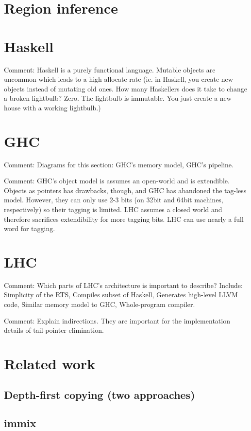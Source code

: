 \documentclass[a4paper,oneside]{memoir}
\newcommand{\makecomment}[1]{{\color{red} Comment: #1}}
\begin{document}
\section{Region inference}


\section{Haskell}
\makecomment{Haskell is a purely functional language.\cite{HaskellReport} Mutable objects are
uncommon which leads to a high allocate rate (ie. in Haskell, you create new
objects instead of mutating old ones. How many Haskellers does it take to
change a broken lightbulb? Zero. The lightbulb is immutable. You just create
a new house with a working lightbulb.)}

\section{GHC}
\makecomment{Diagrams for this section: GHC's memory model, GHC's pipeline.}

\makecomment{GHC's object model is assumes an open-world and is extendible.
Objects as pointers has drawbacks, though, and GHC has abandoned the tag-less
model. However, they can only use 2-3 bits (on 32bit and 64bit machines,
respectively) so their tagging is limited. LHC assumes a closed world and therefore
sacrifices extendibility for more tagging bits. LHC can use nearly a full word
for tagging.}

\section{LHC}
\makecomment{Which parts of LHC's architecture is important to describe? \cite{LHC}
Include: Simplicity of the RTS, Compiles subset of Haskell, Generates high-level
LLVM code, Similar memory model to GHC, Whole-program compiler.}

\makecomment{Explain indirections. They are important for the implementation
details of tail-pointer elimination.}

\section{Related work}
\subsection{Depth-first copying (two approaches)}
\subsection{immix}
\end{document}
